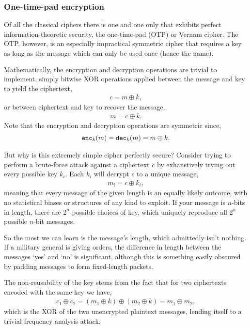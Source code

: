 \subsubsection{One-time-pad encryption} \label{one-time-pad-encryption}

Of all the classical ciphers there is one and one only that exhibits perfect information-theoretic security, the one-time-pad (OTP) or Vernam cipher. The OTP, however, is an especially impractical symmetric cipher that requires a key as long as the message which can only be used once (hence the name).

Mathematically, the encryption and decryption operations are trivial to implement, simply bitwise XOR operations applied between the message and key to yield the ciphertext,
\begin{align}
	c = m \oplus k,
\end{align}
or between ciphertext and key to recover the message,
\begin{align}
	m = c \oplus k.
\end{align}
Note that the encryption and decryption operations are symmetric since,
\begin{align}
	{\tt enc}_k(m) = {\tt dec}_k(m) = m \oplus k.
\end{align}

But why is this extremely simple cipher perfectly secure? Consider trying to perform a brute-force attack against a ciphertext $c$ by exhaustively trying out every possible key $k_i$. Each $k_i$ will decrypt $c$ to a unique message, 
\begin{align}
    m_i = c \oplus k_i,
\end{align}
meaning that every message of the given length is an equally likely outcome, with no statistical biases or structures of any kind to exploit. If your message is $n$-bits in length, there are $2^n$ possible choices of key, which uniquely reproduce all $2^n$ possible $n$-bit messages.

So the most we can learn is the message's length, which admittedly isn't nothing. If a military general is giving orders, the difference in length between the messages `yes' and `no' is significant, although this is something easily obscured by padding messages to form fixed-length packets.

The non-reusability of the key stems from the fact that for two ciphertexts encoded with the same key we have,
\begin{align}
	c_1\oplus c_2 = (m_1\oplus k)\oplus(m_2\oplus k) = m_1 \oplus m_2,
\end{align}
which is the XOR of the two unencrypted plaintext messages, lending itself to a trivial frequency analysis attack.

